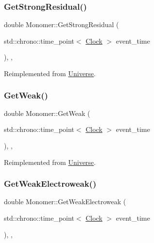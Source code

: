 \subsubsection{\texorpdfstring{Get\+Strong\+Residual()}{GetStrongResidual()}}
{\footnotesize\ttfamily double Monomer\+::\+Get\+Strong\+Residual (\begin{DoxyParamCaption}\item[{std\+::chrono\+::time\+\_\+point$<$ \mbox{\hyperlink{universe_8h_a0ef8d951d1ca5ab3cfaf7ab4c7a6fd80}{Clock}} $>$}]{event\+\_\+time }\end{DoxyParamCaption})\hspace{0.3cm}{\ttfamily [inline]}, {\ttfamily [final]}, {\ttfamily [virtual]}}



Reimplemented from \mbox{\hyperlink{classUniverse_af0f4b81950061e63c2855eb40957a5b1}{Universe}}.

\mbox{\label{classMonomer_ac2070d7e39cd0b2a00aa6023ffd51f55}} 
\subsubsection{\texorpdfstring{Get\+Weak()}{GetWeak()}}
{\footnotesize\ttfamily double Monomer\+::\+Get\+Weak (\begin{DoxyParamCaption}\item[{std\+::chrono\+::time\+\_\+point$<$ \mbox{\hyperlink{universe_8h_a0ef8d951d1ca5ab3cfaf7ab4c7a6fd80}{Clock}} $>$}]{event\+\_\+time }\end{DoxyParamCaption})\hspace{0.3cm}{\ttfamily [inline]}, {\ttfamily [final]}, {\ttfamily [virtual]}}



Reimplemented from \mbox{\hyperlink{classUniverse_a4476b7e0a3fc1764909f556257fd9ec7}{Universe}}.

\mbox{\label{classMonomer_aec6e42dde40c5b3142fab880eabb346a}} 
\subsubsection{\texorpdfstring{Get\+Weak\+Electroweak()}{GetWeakElectroweak()}}
{\footnotesize\ttfamily double Monomer\+::\+Get\+Weak\+Electroweak (\begin{DoxyParamCaption}\item[{std\+::chrono\+::time\+\_\+point$<$ \mbox{\hyperlink{universe_8h_a0ef8d951d1ca5ab3cfaf7ab4c7a6fd80}{Clock}} $>$}]{event\+\_\+time }\end{DoxyParamCaption})\hspace{0.3cm}{\ttfamily [inline]}, {\ttfamily [final]}, {\ttfamily [virtual]}}



